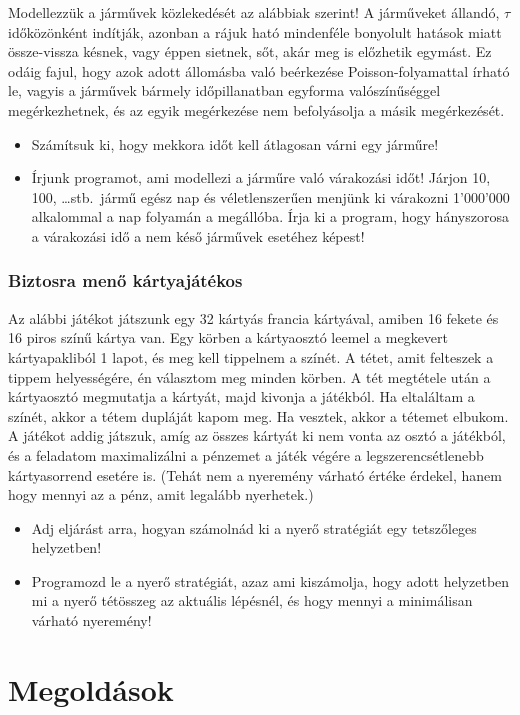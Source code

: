 \documentclass[12pt,a4paper]{article}
\begin{document}
Modellezzük a járművek közlekedését az alábbiak szerint! A járműveket állandó, $\tau$ időközönként indítják, azonban a rájuk ható mindenféle bonyolult hatások miatt össze-vissza késnek, vagy éppen sietnek, sőt, akár meg is előzhetik egymást. Ez odáig fajul, hogy azok adott állomásba való beérkezése Poisson-folyamattal írható le, vagyis a járművek bármely időpillanatban egyforma valószínűséggel megérkezhetnek, és az egyik megérkezése nem befolyásolja a másik megérkezését.

\begin{itemize}
  \item Számítsuk ki, hogy mekkora időt kell átlagosan várni egy járműre!
  \item Írjunk programot, ami modellezi a járműre való várakozási időt! Járjon 10, 100, \ldots stb.\ jármű egész nap és véletlenszerűen menjünk ki várakozni 1'000'000 alkalommal a nap folyamán a megállóba. Írja ki a program, hogy hányszorosa a várakozási idő a nem késő járművek esetéhez képest!
\end{itemize}

\section{Biztosra menő kártyajátékos}
Az alábbi játékot játszunk egy 32 kártyás francia kártyával, amiben 16 fekete és 16 piros színű kártya van. Egy körben a kártyaosztó leemel a megkevert kártyapakliból 1 lapot, és meg kell tippelnem a színét. A tétet, amit felteszek a tippem helyességére, én választom meg minden körben. A tét megtétele után a kártyaosztó megmutatja a kártyát, majd kivonja a játékból. Ha eltaláltam a színét, akkor a tétem dupláját kapom meg. Ha vesztek, akkor a tétemet elbukom. A játékot addig játszuk, amíg az összes kártyát ki nem vonta az osztó a játékból, és a feladatom maximalizálni a pénzemet a játék végére a legszerencsétlenebb kártyasorrend esetére is. (Tehát nem a nyeremény várható értéke érdekel, hanem hogy mennyi az a pénz, amit legalább nyerhetek.)
\begin{itemize}
  \item Adj eljárást arra, hogyan számolnád ki a nyerő stratégiát egy tetszőleges helyzetben!
  \item Programozd le a nyerő stratégiát, azaz ami kiszámolja, hogy adott helyzetben mi a nyerő tétösszeg az aktuális lépésnél, és hogy mennyi a minimálisan várható nyeremény!
\end{itemize}


\part{Megoldások}
\end{document}
